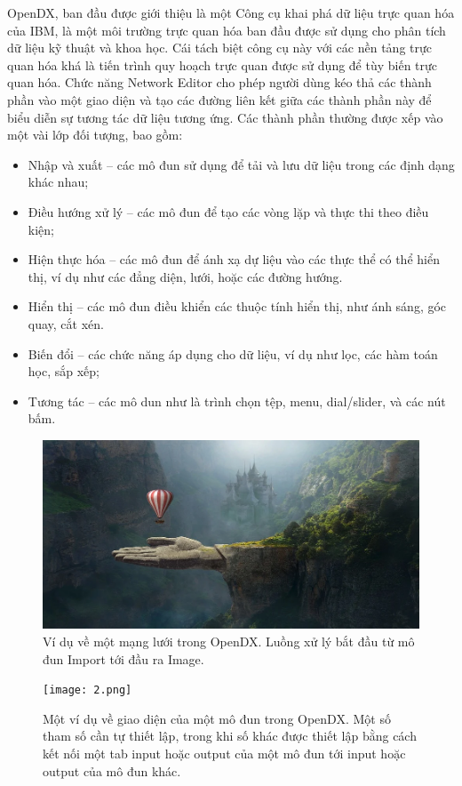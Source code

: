 \documentclass[13pt]{scrartcl} %
\begin{document}
OpenDX, ban đầu được giới thiệu là một Công cụ khai phá dữ liệu trực quan hóa của IBM, là một môi trường trực quan hóa ban đầu được sử dụng cho phân tích dữ liệu kỹ thuật và khoa học. Cái tách biệt công cụ này với các nền tảng trực quan hóa khá là tiến trình quy hoạch trực quan được sử dụng để tùy biến trực quan hóa. Chức năng Network Editor cho phép người dùng kéo thả các thành phần vào một giao diện và tạo các đường liên kết giữa các thành phần này để biểu diễn sự tương tác dữ liệu tương ứng. Các thành phần thường được xếp vào một vài lớp đối tượng, bao gồm:
\begin{itemize}
    \item Nhập và xuất – các mô đun sử dụng để tải và lưu dữ liệu trong các định dạng khác nhau;
    \item Điều hướng xử lý – các mô đun để tạo các vòng lặp và thực thi theo điều kiện;
    \item Hiện thực hóa – các mô đun để ánh xạ dự liệu vào các thực thể có thể hiển thị, ví dụ như các đẳng diện, lưới, hoặc các đường hướng.
    \item Hiển thị – các mô đun điều khiển các thuộc tính hiển thị, như ánh sáng, góc quay, cắt xén.
    \item Biến đổi – các chức năng áp dụng cho dữ liệu, ví dụ như lọc, các hàm toán học, sắp xếp;
    \item Tương tác – các mô dun như là trình chọn tệp, menu, dial/slider, và các nút bấm.
\end{itemize}

\begin{figure}[!ht] %
    \centering
    \includegraphics[width=0.7\columnwidth]{1.png}
    \caption{Ví dụ về một mạng lưới trong OpenDX. Luồng xử lý bắt đầu từ mô đun Import tới đầu ra Image.}
\end{figure}

\begin{figure}[!ht] %
    \centering
    \texttt{[image: 2.png]}
    \caption{Một ví dụ về giao diện của một mô đun trong OpenDX. Một số tham số cần tự thiết lập, trong khi số khác được thiết lập bằng cách kết nối một tab input hoặc output của một mô đun tới input hoặc output của mô đun khác.}
\end{figure}
\end{document}
